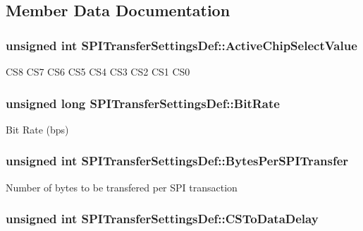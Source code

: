\subsection{\-Member \-Data \-Documentation}
\hypertarget{struct_s_p_i_transfer_settings_def_a32134013c1180fc4ddcfa42b9e1aeed0}{
\subsubsection[{\-Active\-Chip\-Select\-Value}]{\setlength{\rightskip}{0pt plus 5cm}unsigned int {\bf \-S\-P\-I\-Transfer\-Settings\-Def\-::\-Active\-Chip\-Select\-Value}}}\label{struct_s_p_i_transfer_settings_def_a32134013c1180fc4ddcfa42b9e1aeed0}
\-C\-S8 \-C\-S7 \-C\-S6 \-C\-S5 \-C\-S4 \-C\-S3 \-C\-S2 \-C\-S1 \-C\-S0 \hypertarget{struct_s_p_i_transfer_settings_def_a63e79a7391c75e2f16ff51a73fd23638}{
\subsubsection[{\-Bit\-Rate}]{\setlength{\rightskip}{0pt plus 5cm}unsigned long {\bf \-S\-P\-I\-Transfer\-Settings\-Def\-::\-Bit\-Rate}}}\label{struct_s_p_i_transfer_settings_def_a63e79a7391c75e2f16ff51a73fd23638}
\-Bit \-Rate (bps) \hypertarget{struct_s_p_i_transfer_settings_def_a7f24f8717153d307d02780a27f5bf5dd}{
\subsubsection[{\-Bytes\-Per\-S\-P\-I\-Transfer}]{\setlength{\rightskip}{0pt plus 5cm}unsigned int {\bf \-S\-P\-I\-Transfer\-Settings\-Def\-::\-Bytes\-Per\-S\-P\-I\-Transfer}}}\label{struct_s_p_i_transfer_settings_def_a7f24f8717153d307d02780a27f5bf5dd}
\-Number of bytes to be transfered per \-S\-P\-I transaction \hypertarget{struct_s_p_i_transfer_settings_def_a0e6381f4d265cb73a9589f5e1ba695cf}{
\subsubsection[{\-C\-S\-To\-Data\-Delay}]{\setlength{\rightskip}{0pt plus 5cm}unsigned int {\bf \-S\-P\-I\-Transfer\-Settings\-Def\-::\-C\-S\-To\-Data\-Delay}}}\label{struct_s_p_i_transfer_settings_def_a0e6381f4d265cb73a9589f5e1ba695cf}
